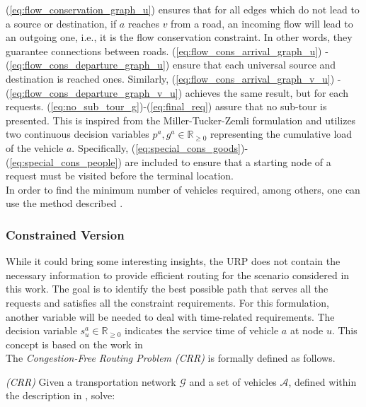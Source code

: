 (\ref{eq:flow_conservation_graph_u}) ensures that for all edges which do not lead to a source or destination, if $a$ reaches $v$ from a road, an incoming flow will lead to an outgoing one, i.e., it is the flow conservation constraint. In other words, they guarantee connections between roads. (\ref{eq:flow_cons_arrival_graph_u}) - (\ref{eq:flow_cons_departure_graph_u}) ensure that each universal source and destination is reached ones. Similarly, (\ref{eq:flow_cons_arrival_graph_v_u}) - (\ref{eq:flow_cons_departure_graph_v_u}) achieves the same result, but for each requests. (\ref{eq:no_sub_tour_g})-(\ref{eq:final_req}) assure that no sub-tour is presented. This is inspired from the Miller-Tucker-Zemli formulation and utilizes two continuous decision variables $p^a, g^a \in \mathbb{R}_{\ge0}$ representing the cumulative load of the vehicle $a$. Specifically, (\ref{eq:special_cons_goods})-(\ref{eq:special_cons_people}) are included to ensure that a starting node of a request must be visited before the terminal location. \\
In order to find the minimum number of vehicles required, among others, one can use the method described . 
\subsubsection*{Constrained Version}
While it could bring some interesting insights, the URP does not contain the necessary information to provide efficient routing for the scenario considered in this work. The goal is to identify the best possible path that serves all the requests and satisfies all the constraint requirements. For this formulation, another variable will be needed to deal with time-related requirements. The decision variable $s_{u}^a \in \mathbb{R}_{\ge0}$ indicates the service time of vehicle $a$ at node $u$. This concept is based on the work in \cite{inbook_twvrp}\\
The \textit{Congestion-Free Routing Problem (CRR)} is formally defined as follows.\\ 
\begin{algori}{\textit{(CRR)}}
	Given a transportation network $\mathcal{G}$ and a set of vehicles $\mathcal{A}$, defined within the description in , solve:
\end{algori}


